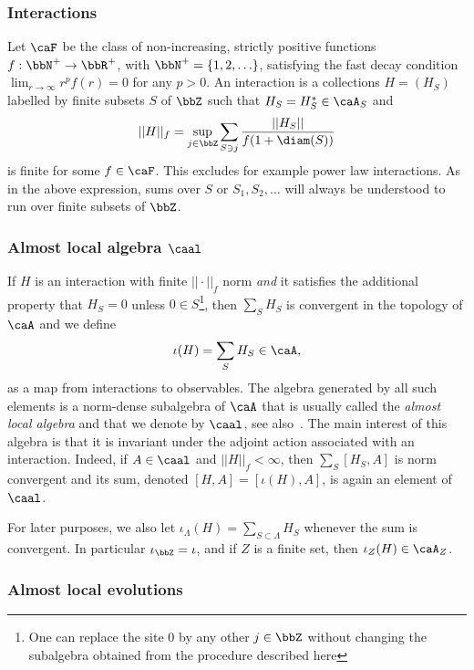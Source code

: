\subsubsection{Interactions}\label{sec: interactions}
Let $\caF$ be the class of non-increasing, strictly positive functions $f:\bbN^+\to\bbR^+$, with $\bbN^+=\{1,2,\ldots\}$, satisfying the fast decay condition $\lim_{r\to\infty}r^pf(r)=0$ for any $p>0$. 
An interaction is a collections $H=(H_S)$ labelled by finite subsets $S$ of $\bbZ$ such that $H_S=H^*_S \in\caA_S$ and
$$
|| H ||_f  = \sup_{j\in\bbZ}  \sum_{S \ni j} \frac{||H_S||}{f(1+\diam(S))}
$$
is finite for some $f \in\caF$. This excludes for example power law interactions. As in the above expression, sums over $S$ or $S_1,S_2,\ldots$ will always be understood to run over  finite subsets of $\bbZ$.


\subsubsection{Almost local algebra $\caal$}\label{subsec:alal}

If $H$ is an interaction with finite $||\cdot||_f$ norm \emph{and} it satisfies the additional property that $H_S=0$ unless $0 \in S$\footnote{One can replace the site $0$ by any other $j\in\bbZ$ without changing the subalgebra obtained from the procedure described here},  then $\sum_{S} H_S$ is convergent in the topology of $\caA$ and we define
$$
\iota(H)= \sum_{S} H_S\in\caA,
$$
as a map from interactions to observables. The algebra generated by all such elements is a norm-dense subalgebra of $\caA$ that is usually called the \emph{almost local algebra} and that we denote by $\caal$, see also~\cite{kapustin2021classification}. The main interest of this algebra is that it is invariant under the adjoint action associated with an interaction. Indeed, if $A\in\caal$ and $||H||_f <\infty $, then $\sum_{S} [H_S,A]$ is norm convergent and its sum, denoted $[H,A] = [\iota(H),A]$, is again an element of $\caal$.

For later purposes, we also let $\iota_\Lambda(H) = \sum_{S\subset\Lambda} H_S$ whenever the sum is convergent. In particular $\iota_{\bbZ} = \iota$, and if $Z$ is a finite set, then $\iota_Z(H) \in \caA_Z$.

\subsubsection{Almost local evolutions}\label{ALEs}


